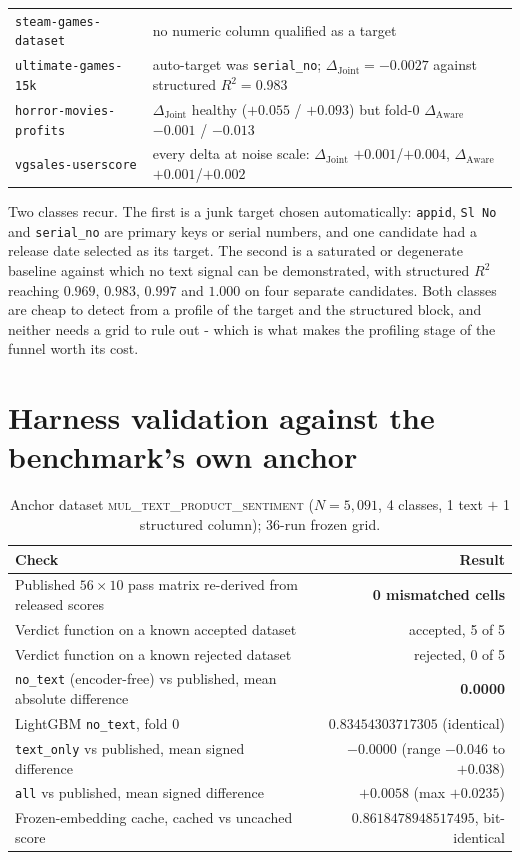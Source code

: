\documentclass{article}
\newcommand{\djoint}{\Delta_{\text{Joint}}}
\newcommand{\daware}{\Delta_{\text{Aware}}}
\begin{document}
\begin{table}[H]
\begin{tabular}{p{}p{}}
\texttt{steam-games-dataset} & no numeric column qualified as a target \\
\texttt{ultimate-games-15k} & auto-target was \texttt{serial\_no}; $\djoint = -0.0027$ against structured $R^2 = 0.983$ \\
\texttt{horror-movies-profits} & $\djoint$ healthy ($+0.055$ / $+0.093$) but fold-0 $\daware$ $-0.001$ / $-0.013$ \\
\texttt{vgsales-userscore} & every delta at noise scale: $\djoint$ $+0.001$/$+0.004$, $\daware$ $+0.001$/$+0.002$ \\
\bottomrule
\end{tabular}
\end{table}

\noindent Two classes recur. The first is a junk target chosen automatically: \texttt{appid},
\texttt{Sl No} and \texttt{serial\_no} are primary keys or serial numbers, and one candidate
had a release date selected as its target. The second is a saturated or degenerate baseline
against which no text signal can be demonstrated, with structured $R^2$ reaching $0.969$,
$0.983$, $0.997$ and $1.000$ on four separate candidates. Both classes are cheap to detect from
a profile of the target and the structured block, and neither needs a grid to rule out - which
is what makes the profiling stage of the funnel worth its cost.


\section{Harness validation against the benchmark's own anchor}
\label{app:anchor}

\begin{table}[H]
\centering\small
\caption{Anchor dataset \textsc{mul\_text\_product\_sentiment} ($N = 5{,}091$, 4 classes,
1 text $+$ 1 structured column); 36-run frozen grid.}
\begin{tabular}{lr}
\toprule
Check & Result \\
\midrule
Published $56 \times 10$ pass matrix re-derived from released scores & \textbf{0 mismatched cells} \\
Verdict function on a known accepted dataset & accepted, 5 of 5 \\
Verdict function on a known rejected dataset & rejected, 0 of 5 \\
\texttt{no\_text} (encoder-free) vs published, mean absolute difference & \textbf{0.0000} \\
\quad LightGBM \texttt{no\_text}, fold 0 & $0.83454303717305$ (identical) \\
\texttt{text\_only} vs published, mean signed difference & $-0.0000$ (range $-0.046$ to $+0.038$) \\
\texttt{all} vs published, mean signed difference & $+0.0058$ (max $+0.0235$) \\
Frozen-embedding cache, cached vs uncached score & $0.8618478948517495$, bit-identical \\
\bottomrule
\end{tabular}
\end{table}
\end{document}
